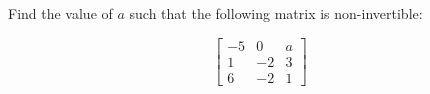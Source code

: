         



\begin{problem}%
    Find the value of $a$ such that the following matrix is non-invertible:

        \[ \begin{bmatrix}
            -5 & 0 & a \\ 1 & -2 & 3 \\ 6 & -2 & 1 
        \end{bmatrix} \]
\end{problem}




        
